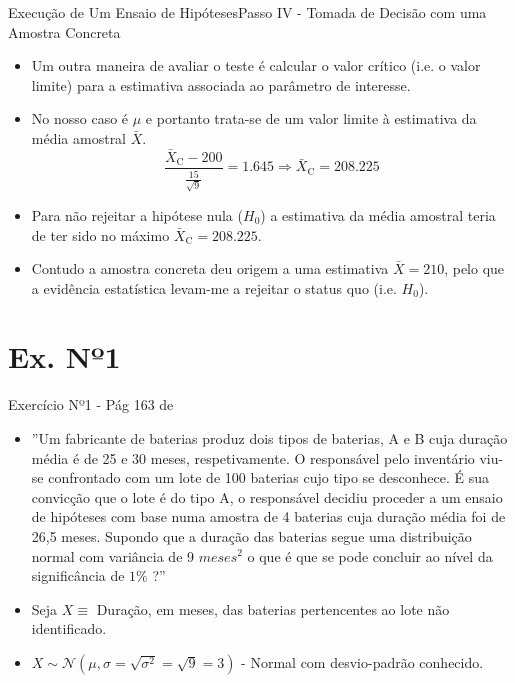 \documentclass[10,5pt, pdf]{beamer}
\begin{document}
\begin{frame}{Execução de Um Ensaio de Hipóteses}{Passo IV - Tomada de Decisão com uma Amostra Concreta}
\begin{itemize}
    \item{Um outra maneira de avaliar o teste é calcular o valor crítico (i.e. o valor limite) para a estimativa associada ao parâmetro de interesse.}
    \pause
    \item{No nosso caso é $\mu$ e portanto trata-se de um valor limite à estimativa da média amostral $\bar{X}$.}
    \pause
    \begin{equation}
        \frac{\bar{X}_{\text{C}} - 200}{\frac{15}{\sqrt{9}}}=1.645\Longrightarrow \bar{X}_{\text{C}}=208.225
    \end{equation}
    \pause
    \item{Para não rejeitar a hipótese nula ($H_0$) a estimativa da média amostral teria de ter sido no máximo $\bar{X}_{\text{C}}=208.225$.}
    \pause
    \item{Contudo a amostra concreta deu origem a uma estimativa $\bar{X}=210$, pelo que a evidência estatística levam-me a rejeitar o status quo (i.e. $H_0$).}
\end{itemize}
\end{frame}

\section{Ex. Nº1}\label{sec:ex1}
\begin{frame}{Exercício Nº1 - Pág 163 de \cite{reis2021}}
\begin{itemize}
\item{''Um fabricante de baterias produz dois tipos de baterias, A e B cuja duração média é de 25 e 30 meses, respetivamente. O responsável pelo inventário viu-se confrontado com um lote de 100 baterias cujo tipo se desconhece. É sua convicção que o lote é do tipo A, o responsável decidiu proceder a um ensaio de hipóteses com base numa amostra de 4 baterias cuja duração média foi de 26,5 meses. Supondo que a duração das baterias segue uma distribuição normal com variância de 9 $meses^2$ o que é que se pode concluir ao nível da significância de $1\%$ ?''}
\pause
\item{Seja $X\equiv$ Duração, em meses, das baterias pertencentes ao lote não identificado.}
\pause
\item{$X\sim \mathcal{N}(\mu, \sigma=\sqrt{\sigma^2}=\sqrt{9}=3)$ - Normal com desvio-padrão conhecido.}


\end{itemize}
\end{frame}
\end{document}
